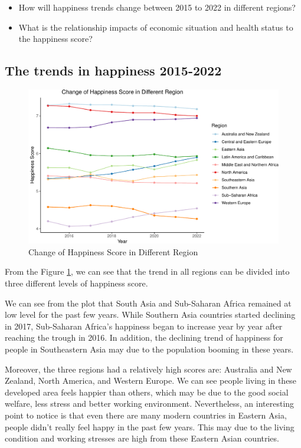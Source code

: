 \documentclass[11pt,a4paper,]{article}
\begin{document}
\begin{itemize}
\item
  How will happiness trends change between 2015 to 2022 in different regions?
\item
  What is the relationship impacts of economic situation and health status to the happiness score?
\end{itemize}

\hypertarget{the-trends-in-happiness-2015-2022}{%
\subsection{The trends in happiness 2015-2022}\label{the-trends-in-happiness-2015-2022}}

\begin{figure}
\centering
\includegraphics{Assignment4_files/figure-latex/trends-1.pdf}
\caption{\label{fig:trends}Change of Happiness Score in Different Region}
\end{figure}

From the Figure \ref{fig:trends}, we can see that the trend in all regions can be divided into three different levels of happiness score.

We can see from the plot that South Asia and Sub-Saharan Africa remained at low level for the past few years. While Southern Asia countries started declining in 2017, Sub-Saharan Africa's happiness began to increase year by year after reaching the trough in 2016. In addition, the declining trend of happiness for people in Southeastern Asia may due to the population booming in these years.

Moreover, the three regions had a relatively high scores are: Australia and New Zealand, North America, and Western Europe. We can see people living in these developed area feels happier than others, which may be due to the good social welfare, less stress and better working environment. Nevertheless, an interesting point to notice is that even there are many modern countries in Eastern Asia, people didn't really feel happy in the past few years. This may due to the living condition and working stresses are high from these Eastern Asian countries.
\end{document}

